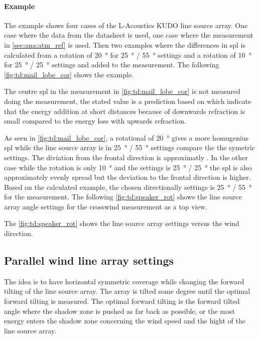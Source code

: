 \paragraph{Example} The example shows four cases of the L-Acoustics KUDO line source array. One case where the data from the datasheet is used, one case where the measurement in \autoref{sec:ana:atm_ref} is used. Then two examples where the differences in \gls{spl} is calculated from a rotation of \SI{20}{\degree} for \SI{25}{\degree} / \SI{55}{\degree} settings and a rotation of  \SI{10}{\degree} for \SI{25}{\degree} / \SI{25}{\degree} settings and added to the measurement. The following \autoref{fig:td:mail_lobe_cor} shows the example.



The centre \gls{spl} in the measurement in \autoref{fig:td:mail_lobe_cor} is not measured doing the measurement, the stated value is a prediction based on \citep{review_of_sound} which indicate that the energy addition at short distances because of downwards refraction is small compared to the energy loss with upwards refraction. 

As seen in \autoref{fig:td:mail_lobe_cor}, a rotational of \SI{20}{\degree} gives a more homugenius \gls{spl} while the line source array is in \SI{25}{\degree} / \SI{55}{\degree} settings compare the the symetric settings. The diviation from the frontal direction is approximatly . In the other case while the rotation is only \SI{10}{\degree} and the settings is \SI{25}{\degree} / \SI{25}{\degree} the \gls{spl} is also approximately evenly spread but the deviation to the frontal direction is higher. Based on the calculated example, the chosen directionally settings is \SI{25}{\degree} / \SI{55}{\degree} for the measurement. The following \autoref{fig:td:speaker_rot} shows the line source array angle settings for the crosswind measurement as a top view. 


The \autoref{fig:td:speaker_rot} shows the line source array settings versus the wind direction.

\subsection{Parallel wind line array settings}\label{sub:des:par_set}
The idea is to have horizontal symmetric coverage while changing the forward tilting of the line source array. The array is tilted some degree until the optimal forward tilting is measured. The optimal forward tilting is the forward tilted angle where the shadow zone is pushed as far back as possible, or the most energy enters the shadow zone concerning the wind speed and the hight of the line source array. 



